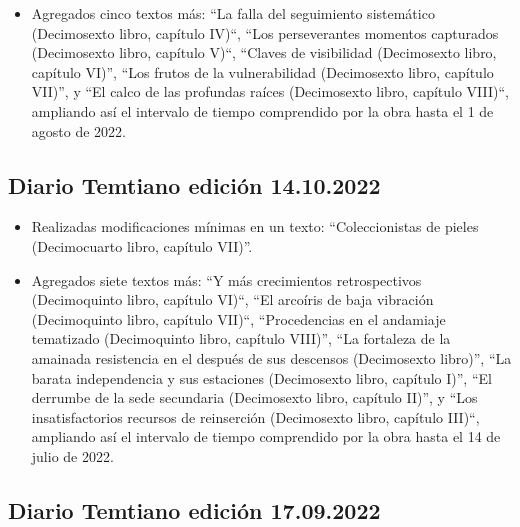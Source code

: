 \documentclass[
]{book}
\providecommand{\tightlist}{%
  \setlength{\itemsep}{0pt}\setlength{\parskip}{0pt}}
\begin{document}
\begin{itemize}
\tightlist
\item
  Agregados cinco textos más: ``La falla del seguimiento sistemático (Decimosexto libro, capítulo IV)``, ``Los perseverantes momentos capturados (Decimosexto libro, capítulo V)``, ``Claves de visibilidad (Decimosexto libro, capítulo VI)'', ``Los frutos de la vulnerabilidad (Decimosexto libro, capítulo VII)'', y ``El calco de las profundas raíces (Decimosexto libro, capítulo VIII)``, ampliando así el intervalo de tiempo comprendido por la obra hasta el 1 de agosto de 2022.
\end{itemize}

\hypertarget{diario-temtiano-ediciuxf3n-14.10.2022}{%
\subsection*{Diario Temtiano edición 14.10.2022}\label{diario-temtiano-ediciuxf3n-14.10.2022}}

\begin{itemize}
\item
  Realizadas modificaciones mínimas en un texto: ``Coleccionistas de pieles (Decimocuarto libro, capítulo VII)''.
\item
  Agregados siete textos más: ``Y más crecimientos retrospectivos (Decimoquinto libro, capítulo VI)``, ``El arcoíris de baja vibración (Decimoquinto libro, capítulo VII)``, ``Procedencias en el andamiaje tematizado (Decimoquinto libro, capítulo VIII)'', ``La fortaleza de la amainada resistencia en el después de sus descensos (Decimosexto libro)'', ``La barata independencia y sus estaciones (Decimosexto libro, capítulo I)'', ``El derrumbe de la sede secundaria (Decimosexto libro, capítulo II)'', y ``Los insatisfactorios recursos de reinserción (Decimosexto libro, capítulo III)``, ampliando así el intervalo de tiempo comprendido por la obra hasta el 14 de julio de 2022.
\end{itemize}

\hypertarget{diario-temtiano-ediciuxf3n-17.09.2022}{%
\subsection*{Diario Temtiano edición 17.09.2022}\label{diario-temtiano-ediciuxf3n-17.09.2022}}
\end{document}
